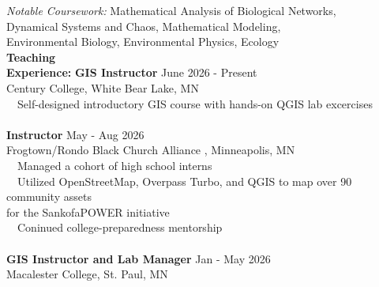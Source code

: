 \documentclass[letterpaper,12pt]{article}
\numberwithin{equation}{section}
\begin{document}
	\hspace*{1.16in} \textit{Notable Coursework:} Mathematical Analysis of Biological Networks, \\
    \hspace*{2.72in} Dynamical Systems and Chaos, Mathematical Modeling,\\ 
    \hspace*{2.72in} Environmental Biology, Environmental Physics, Ecology
\\
 \noindent\textbf{Teaching}\\
\noindent\textbf{Experience:}
\hspace*{.17in}\textbf{GIS Instructor} \hspace*{3.6in} June 2026 - Present \\ \hspace*{1.16in} Century College, White Bear Lake, MN \\ 
 \hspace*{1.2in} \textbullet ~~Self-designed introductory GIS course with hands-on QGIS lab excercises\\
 \\
\hspace*{1.16in}\textbf{Instructor} \hspace*{4.2in} May - Aug 2026 \\ \hspace*{1.16in} Frogtown/Rondo Black Church Alliance , Minneapolis, MN \\ 
\hspace*{1.2in} \textbullet ~~Managed a cohort of high school interns\\
\hspace*{1.2in} \textbullet ~~Utilized OpenStreetMap, Overpass Turbo, and QGIS to map over 90 community assets\\
\hspace*{1.6in} for the SankofaPOWER initiative \\
\hspace*{1.2in} \textbullet ~~Coninued college-preparedness mentorship\\
\\
\hspace*{1.16in}\textbf{GIS Instructor and Lab Manager} \hspace*{2.4in} Jan - May 2026 \\ \hspace*{1.16in} Macalester College, St. Paul, MN \\ 
\end{document}
